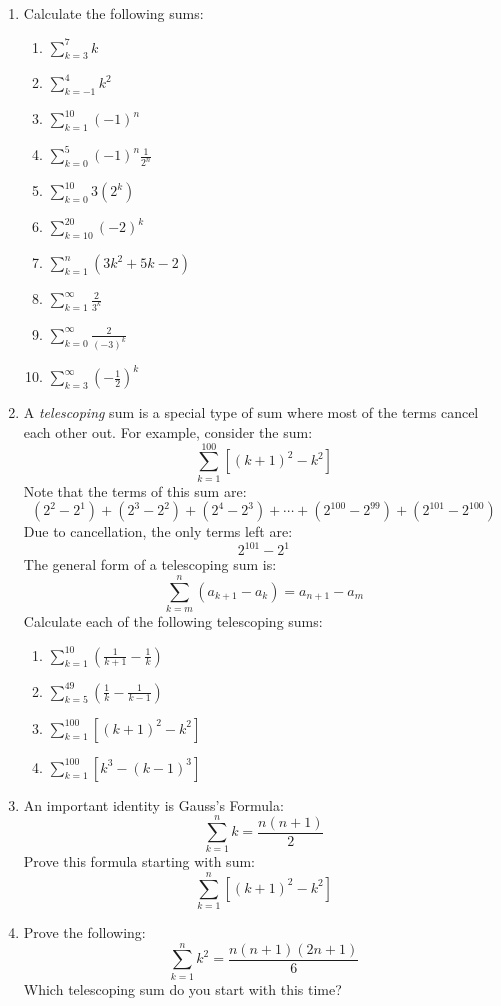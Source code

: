 \documentclass[letterpaper,12pt,fleqn]{article}
\begin{document}
\begin{enumerate}[left=0in,itemsep=0.5in]
\item Calculate the following sums:
  \begin{enumerate}
  \item \(\displaystyle\sum_{k=3}^7k\)
  \item \(\displaystyle\sum_{k=-1}^4k^2\)
  \item \(\displaystyle\sum_{k=1}^{10}(-1)^n\)
  \item \(\displaystyle\sum_{k=0}^{5}(-1)^n\frac{1}{2^n}\)
  \item \(\displaystyle\sum_{k=0}^{10}3(2^k)\)
  \item \(\displaystyle\sum_{k=10}^{20}(-2)^k\)
  \item \(\displaystyle\sum_{k=1}^n(3k^2+5k-2)\)
  \item \(\displaystyle\sum_{k=1}^{\infty}\frac{2}{3^k}\)
  \item \(\displaystyle\sum_{k=0}^{\infty}\frac{2}{(-3)^k}\)
  \item \(\displaystyle\sum_{k=3}^{\infty}\left(-\frac{1}{2}\right)^k\)
  \end{enumerate}

\item A \emph{telescoping} sum is a special type of sum where most of the terms cancel each other out.  For
  example, consider the sum:
  \[\sum_{k=1}^{100}[(k+1)^2-k^2]\]
  Note that the terms of this sum are:
  \[(2^2-2^1)+(2^3-2^2)+(2^4-2^3)+\cdots+(2^{100}-2^{99})+(2^{101}-2^{100})\]
  Due to cancellation, the only terms left are:
  \[2^{101}-2^1\]
  The general form of a telescoping sum is:
  \[\sum_{k=m}^n(a_{k+1}-a_k)=a_{n+1}-a_m\]
  Calculate each of the following telescoping sums:
  \begin{enumerate}
  \item \(\displaystyle\sum_{k=1}^{10}\left(\frac{1}{k+1}-\frac{1}{k}\right)\)
  \item \(\displaystyle\sum_{k=5}^{49}\left(\frac{1}{k}-\frac{1}{k-1}\right)\)
  \item \(\displaystyle\sum_{k=1}^{100}[(k+1)^2-k^2]\)
  \item \(\displaystyle\sum_{k=1}^{100}[k^3-(k-1)^3]\)
  \end{enumerate}

\item An important identity is Gauss's Formula:
  \[\sum_{k=1}^nk=\frac{n(n+1)}{2}\]
  Prove this formula starting with sum:
  \[\sum_{k=1}^n[(k+1)^2-k^2]\]

\item Prove the following:
  \[\sum_{k=1}^nk^2=\frac{n(n+1)(2n+1)}{6}\]
  Which telescoping sum do you start with this time?
\end{enumerate}
\end{document}
